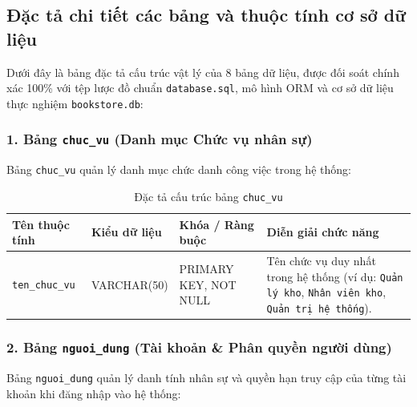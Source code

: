 \documentclass[12pt,a4paper]{article}
\begin{document}
\newpage
\subsection{Đặc tả chi tiết các bảng và thuộc tính cơ sở dữ liệu}
\label{subsec:dac-ta-bang-csdl}

Dưới đây là bảng đặc tả cấu trúc vật lý của 8 bảng dữ liệu, được đối soát chính xác 100\% với tệp lược đồ chuẩn \texttt{database.sql}, mô hình ORM và cơ sở dữ liệu thực nghiệm \texttt{bookstore.db}:

\subsubsection*{1. Bảng \texttt{chuc\_vu} (Danh mục Chức vụ nhân sự)}
Bảng \texttt{chuc\_vu} quản lý danh mục chức danh công việc trong hệ thống:

\begin{table}[H]
\centering
\small
\renewcommand{\arraystretch}{1.2}
\begin{tabularx}{\textwidth}{|>{\raggedright\arraybackslash}p{3.0cm}|>{\raggedright\arraybackslash}p{2.6cm}|>{\raggedright\arraybackslash}p{3.8cm}|>{\raggedright\arraybackslash}X|}
\hline
\textbf{Tên thuộc tính} & \textbf{Kiểu dữ liệu} & \textbf{Khóa / Ràng buộc} & \textbf{Diễn giải chức năng} \\
\hline
\texttt{ten\_chuc\_vu} & VARCHAR(50) & PRIMARY KEY, NOT NULL & Tên chức vụ duy nhất trong hệ thống (ví dụ: \texttt{Quản lý kho}, \texttt{Nhân viên kho}, \texttt{Quản trị hệ thống}). \\
\hline
\end{tabularx}
\caption{Đặc tả cấu trúc bảng \texttt{chuc\_vu}}
\label{tab:csdl-chucvu}
\end{table}

\subsubsection*{2. Bảng \texttt{nguoi\_dung} (Tài khoản \& Phân quyền người dùng)}
Bảng \texttt{nguoi\_dung} quản lý danh tính nhân sự và quyền hạn truy cập của từng tài khoản khi đăng nhập vào hệ thống:
\end{document}
